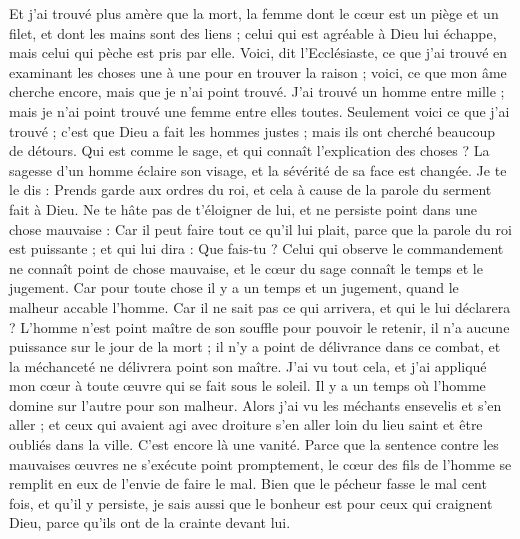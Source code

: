 \begin{multicols}{2}
Et j'ai trouvé plus amère que la mort, la femme dont le cœur est un piège et un filet, et dont les mains sont des liens ; celui qui est agréable à Dieu lui échappe, mais celui qui pèche est pris par elle.
Voici, dit l'Ecclésiaste, ce que j'ai trouvé en examinant les choses une à une pour en trouver la raison ;
voici, ce que mon âme cherche encore, mais que je n'ai point trouvé. J'ai trouvé un homme entre mille ; mais je n'ai point trouvé une femme entre elles toutes.
Seulement voici ce que j'ai trouvé ; c'est que Dieu a fait les hommes justes ; mais ils ont cherché beaucoup de détours.
\VerseOne{}Qui est comme le sage, et qui connaît l'explication des choses ? La sagesse d'un homme éclaire son visage, et la sévérité de sa face est changée.
Je te le dis : Prends garde aux ordres du roi, et cela à cause de la parole du serment fait à Dieu.
Ne te hâte pas de t'éloigner de lui, et ne persiste point dans une chose mauvaise : Car il peut faire tout ce qu'il lui plait,
parce que la parole du roi est puissante ; et qui lui dira : Que fais-tu ?
Celui qui observe le commandement ne connaît point de chose mauvaise, et le cœur du sage connaît le temps et le jugement.
Car pour toute chose il y a un temps et un jugement, quand le malheur accable l'homme.
Car il ne sait pas ce qui arrivera, et qui le lui déclarera ?
L'homme n'est point maître de son souffle pour pouvoir le retenir, il n'a aucune puissance sur le jour de la mort ; il n'y a point de délivrance dans ce combat, et la méchanceté ne délivrera point son maître.
J'ai vu tout cela, et j'ai appliqué mon cœur à toute œuvre qui se fait sous le soleil. Il y a un temps où l'homme domine sur l'autre pour son malheur.
Alors j'ai vu les méchants ensevelis et s'en aller ; et ceux qui avaient agi avec droiture s'en aller loin du lieu saint et être oubliés dans la ville. C'est encore là une vanité.
Parce que la sentence contre les mauvaises œuvres ne s'exécute point promptement, le cœur des fils de l'homme se remplit en eux de l'envie de faire le mal.
Bien que le pécheur fasse le mal cent fois, et qu'il y persiste, je sais aussi que le bonheur est pour ceux qui craignent Dieu, parce qu'ils ont de la crainte devant lui.

\end{multicols}
